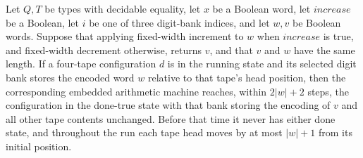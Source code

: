 \begin{theorem}
\label{Turing.recordStep_arithmetic_transport}
\leanok
{}
Let $Q,T$ be types with decidable equality, let $x$ be a Boolean word, let $increase$ be
a Boolean, let $i$ be one of three digit-bank indices, and let $w,v$ be Boolean words.
Suppose that applying fixed-width increment to $w$ when $increase$ is true, and
fixed-width decrement otherwise, returns $v$, and that $v$ and $w$ have the same length.
If a four-tape configuration $d$ is in the running state and its selected digit bank
stores the encoded word $w$ relative to that tape's head position, then the
corresponding embedded arithmetic machine reaches, within $2|w|+2$ steps, the
configuration in the done-true state with that bank storing the encoding of $v$ and all
other tape contents unchanged. Before that time it never has either done state, and
throughout the run each tape head moves by at most $|w|+1$ from its initial position.
\end{theorem}

